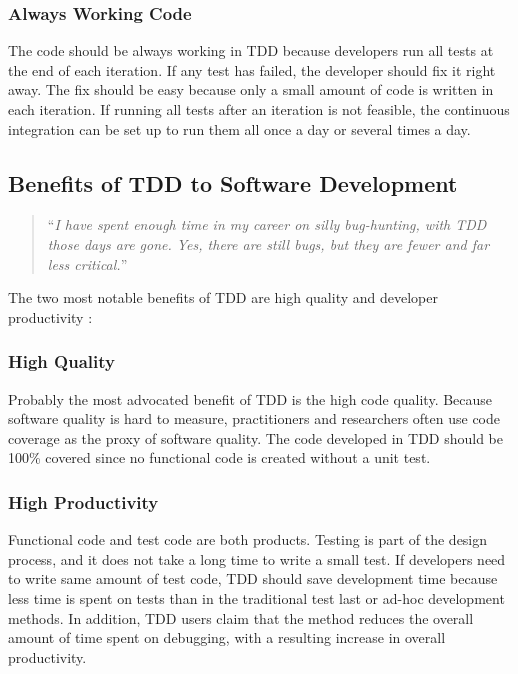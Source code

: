 \subsubsection{Always Working Code}
The code should be always working in TDD because developers run 
all tests at the end of each iteration. If any test has failed, 
the developer should fix it right away. The fix should be easy because 
only a small amount of code is written in each iteration. If running 
all tests after an iteration is not feasible, the continuous 
integration can be set up to run them all once a day or several 
times a day. 

\subsection{Benefits of TDD to Software Development}

\begin{quotation}
``\textit{I have spent enough time in my career on silly 
bug-hunting, with TDD those days are gone. Yes, there are 
still bugs, but they are fewer and far less critical.}'' 
\cite{ExtremeJSBlog} 

\end{quotation}

The two most notable benefits of TDD are high quality
and developer productivity \cite{Beck:01,Janzen:05} :

\subsubsection{High Quality}
Probably the most advocated benefit of TDD is the high 
code quality. Because software quality is hard to measure, 
practitioners and researchers often use code coverage as 
the proxy of software quality. The code developed in TDD 
should be 100\% covered since no functional code is created 
without a unit test. 

\subsubsection{High Productivity}
Functional code and test code are both products. Testing is 
part of the design process, and it does not take a long time 
to write a small test. If developers need to write same amount 
of test code, TDD should save development time because less 
time is spent on tests than in the traditional test last or ad-hoc 
development methods. In addition, TDD users claim that the 
method reduces the overall amount of time spent on debugging, 
with a resulting increase in overall productivity\cite{Williams:03}.

